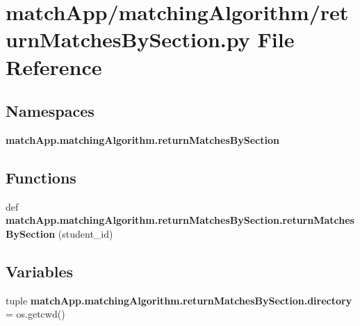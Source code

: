 \section{match\+App/matching\+Algorithm/return\+Matches\+By\+Section.py File Reference}
\label{return_matches_by_section_8py}
\subsection*{Namespaces}
\begin{DoxyCompactItemize}
\item 
 {\bf match\+App.\+matching\+Algorithm.\+return\+Matches\+By\+Section}
\end{DoxyCompactItemize}
\subsection*{Functions}
\begin{DoxyCompactItemize}
\item 
def {\bf match\+App.\+matching\+Algorithm.\+return\+Matches\+By\+Section.\+return\+Matches\+By\+Section} (student\+\_\+id)
\end{DoxyCompactItemize}
\subsection*{Variables}
\begin{DoxyCompactItemize}
\item 
tuple {\bf match\+App.\+matching\+Algorithm.\+return\+Matches\+By\+Section.\+directory} = os.\+getcwd()
\end{DoxyCompactItemize}
